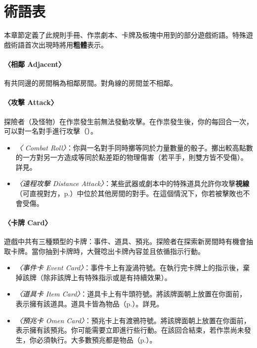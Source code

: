 
\section{術語表} \label{sec:glossary}

本章節定義了此規則手冊、作祟劇本、卡牌及板塊中用到的部分遊戲術語。特殊遊戲術語首次出現時將用\textbf{粗體}表示。

\paragraph{〈相鄰 Adjacent〉}
有共同邊的房間稱為相鄰房間。對角線的房間並不相鄰。

\paragraph{〈攻擊 Attack〉}
探險者（及怪物）在作祟發生前無法發動攻擊。在作祟發生後，你的每回合一次，可以對一名對手進行攻擊（）。

\begin{itemize}
  \item \textit{〈 Combat Roll〉}：你與一名對手同時擲等同於力量數量的骰子。擲出較高點數的一方對另一方造成等同於點差距的物理傷害（若平手，則雙方皆不受傷）。詳見。
  \item \textit{〈遠程攻擊 Distance Attack〉}：某些武器或劇本中的特殊道具允許你攻擊\textbf{視線}（可直視對方，p.\pageref{glossary:line-of-sight}）中位於其他房間的對手。在這個情況下，你若被擊敗也不會受傷。
\end{itemize}

\paragraph{〈卡牌 Card〉}
遊戲中共有三種類型的卡牌：事件、道具、預兆。探險者在探索新房間時有機會抽取卡牌。當你抽到卡牌時，大聲唸出卡牌內容並且依循指示行動。

\begin{itemize}
  \item \textit{〈事件卡 Event Card〉}：事件卡上有漩渦符號\EventSymbol{}。在執行完卡牌上的指示後，棄掉該牌（除非該牌上有特殊指示或是有持續效果）。
  \item \textit{〈道具卡 Item Card〉}：道具卡上有牛頭符號\ItemSymbol{}。將該牌面朝上放置在你面前，表示擁有該道具。道具卡皆為物品（p.\pageref{glossary:item}）。詳見。
  \item \textit{〈預兆卡 Omen Card〉}：預兆卡上有渡鴉符號\OmenSymbol{}。將該牌面朝上放置在你面前，表示擁有該預兆。你可能需要立即進行些行動。在該回合結束，若作祟尚未發生，你必須執行。大多數預兆都是物品（p.\pageref{glossary:item}）。
\end{itemize}

